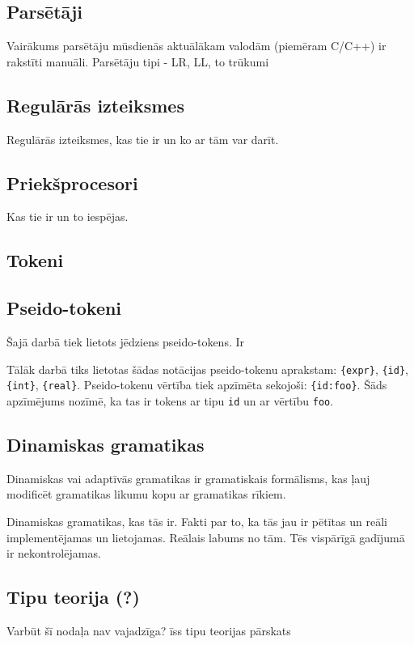 \subsection{Parsētāji}
Vairākums parsētāju mūsdienās aktuālākam valodām (piemēram C/C++) ir rakstīti manuāli. 
Parsētāju tipi - LR, LL, to trūkumi

\subsection{Regulārās izteiksmes}
Regulārās izteiksmes, kas tie ir un ko ar tām var darīt.

\subsection{Priekšprocesori}
Kas tie ir un to iespējas.

\subsection{Tokeni}

\subsection{Pseido-tokeni}
Šajā darbā tiek lietots jēdziens pseido-tokens. Ir 

Tālāk darbā tiks lietotas šādas notācijas pseido-tokenu aprakstam: \verb|{expr}|, \verb|{id}|, \verb|{int}|, \verb|{real}|. Pseido-tokenu vērtība tiek apzīmēta sekojoši: \verb|{id:foo}|. Šāds apzīmējums nozīmē, ka tas ir tokens ar tipu \verb|id| un ar vērtību \verb|foo|.

\subsection{\label{subsec:dynamicgrammars}Dinamiskas gramatikas}
Dinamiskas vai adaptīvās gramatikas ir gramatiskais formālisms, kas ļauj modificēt gramatikas likumu kopu ar gramatikas rīkiem. \cite{Shutt:AdaptiveGrammars}

Dinamiskas gramatikas, kas tās ir. Fakti par to, ka tās jau ir pētītas un reāli implementējamas un lietojamas. Reālais labums no tām.
 Tēs vispārīgā gadījumā ir nekontrolējamas.


\subsection{Tipu teorija (?)}
Varbūt šī nodaļa nav vajadzīga?
īss tipu teorijas pārskats